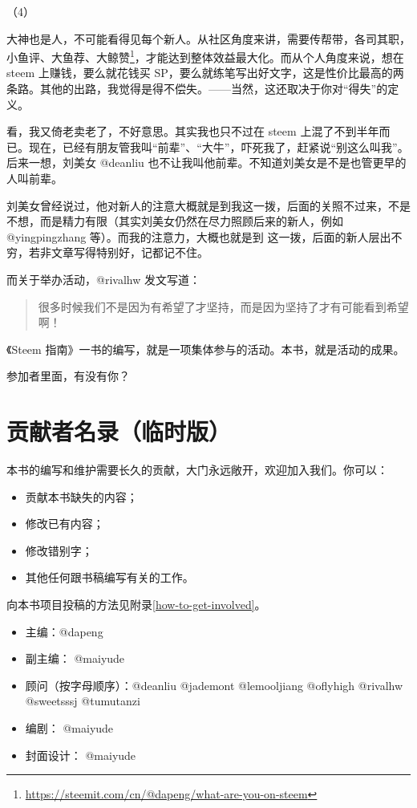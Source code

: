 \documentclass[]{ctexbook}
\renewcommand{\href}[2]{#2\footnote{\url{#1}}}
\begin{document}
（4）

大神也是人，不可能看得见每个新人。从社区角度来讲，需要传帮带，各司其职，\href{https://steemit.com/cn/@dapeng/what-are-you-on-steem}{小鱼评、大鱼荐、大鲸赞}，才能达到整体效益最大化。而从个人角度来说，想在 steem 上赚钱，要么就花钱买 SP，要么就练笔写出好文字，这是性价比最高的两条路。其他的出路，我觉得是得不偿失。------当然，这还取决于你对``得失''的定义。

看，我又倚老卖老了，不好意思。其实我也只不过在 steem 上混了不到半年而已。现在，已经有朋友管我叫``前辈''、``大牛''，吓死我了，赶紧说``别这么叫我''。后来一想，刘美女 @deanliu 也不让我叫他前辈。不知道刘美女是不是也管更早的人叫前辈。

刘美女曾经说过，他对新人的注意大概就是到我这一拨，后面的关照不过来，不是不想，而是精力有限（其实刘美女仍然在尽力照顾后来的新人，例如 @yingpingzhang 等）。而我的注意力，大概也就是到 \citet{winniex} 这一拨，后面的新人层出不穷，若非文章写得特别好，记都记不住。

而关于举办活动，@rivalhw 发文写道：

\begin{quote}
很多时候我们不是因为有希望了才坚持，而是因为坚持了才有可能看到希望啊！　
\end{quote}

《Steem 指南》一书的编写，就是一项集体参与的活动。本书，就是活动的成果。

参加者里面，有没有你？

\hypertarget{aacontributors}{%
\chapter*{贡献者名录（临时版）}\label{aacontributors}}

本书的编写和维护需要长久的贡献，大门永远敞开，欢迎加入我们。你可以：

\begin{itemize}
\item
  贡献本书缺失的内容；
\item
  修改已有内容；
\item
  修改错别字；
\item
  其他任何跟书稿编写有关的工作。
\end{itemize}

向本书项目投稿的方法见附录\ref{how-to-get-involved}。

\begin{itemize}
\item
  主编：@dapeng
\item
  副主编： @maiyude
\item
  顾问（按字母顺序）：@deanliu @jademont @lemooljiang @oflyhigh @rivalhw @sweetsssj @tumutanzi
\item
  编剧： @maiyude
\item
  封面设计： @maiyude
\end{itemize}
\end{document}
